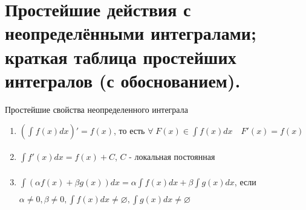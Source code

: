 \documentclass[../main.tex]{subfiles}
\begin{document}
\newpage
\section{Простейшие действия с неопределёнными интегралами; краткая таблица простейших интегралов (с обоснованием).}
\begin{prop}{Простейшие свойства неопределенного интеграла}
    \begin{enumerate}
        \item \( \left( \int_{ }^{ } f\left( x\right)dx\right)'=f\left( x\right)\), то есть \( \forall \; F\left( x\right) \in \displaystyle\int\limits_{ }^{ } f\left( x\right)dx\quad F'\left( x\right)=f\left( x\right)\)
        \item \( \displaystyle\int\limits_{ }^{ } f'\left( x\right)dx=f\left( x\right)+C\), \( C\) - локальная постоянная
        \item \( \displaystyle\int\limits_{ }^{ } \left( \alpha f\left( x\right)+ \beta g \left( x\right)\right)dx= \alpha \displaystyle\int\limits_{ }^{ } f\left( x\right)dx + \beta \displaystyle\int\limits_{ }^{ } g \left( x\right)dx\), если \\\( \alpha \neq 0, \beta \neq 0, \displaystyle\int\limits_{ }^{ } f\left( x\right)dx \neq \varnothing, \displaystyle\int\limits_{}^{ } g \left( x\right)dx \neq \varnothing  \)
    \end{enumerate}
\end{prop}
\end{document}
